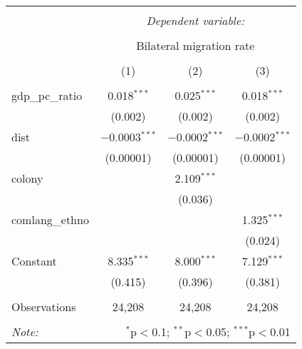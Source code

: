 
\begin{table}[!htbp] \centering 
  \caption{} 
  \label{} 
\begin{tabular}{@{\extracolsep{0pt}}lccc} 
\\[-1.8ex]\hline 
\hline \\[-1.8ex] 
 & \multicolumn{3}{c}{\textit{Dependent variable:}} \\ 
\cline{2-4} 
\\[-1.8ex] & \multicolumn{3}{c}{Bilateral migration rate} \\ 
\\[-1.8ex] & (1) & (2) & (3)\\ 
\hline \\[-1.8ex] 
 gdp\_pc\_ratio & 0.018$^{***}$ & 0.025$^{***}$ & 0.018$^{***}$ \\ 
  & (0.002) & (0.002) & (0.002) \\ 
  dist & $-$0.0003$^{***}$ & $-$0.0002$^{***}$ & $-$0.0002$^{***}$ \\ 
  & (0.00001) & (0.00001) & (0.00001) \\ 
  colony &  & 2.109$^{***}$ &  \\ 
  &  & (0.036) &  \\ 
  comlang\_ethno &  &  & 1.325$^{***}$ \\ 
  &  &  & (0.024) \\ 
  Constant & 8.335$^{***}$ & 8.000$^{***}$ & 7.129$^{***}$ \\ 
  & (0.415) & (0.396) & (0.381) \\ 
 \hline \\[-1.8ex] 
Observations & 24,208 & 24,208 & 24,208 \\ 
\hline 
\hline \\[-1.8ex] 
\textit{Note:}  & \multicolumn{3}{r}{$^{*}$p$<$0.1; $^{**}$p$<$0.05; $^{***}$p$<$0.01} \\ 
\end{tabular} 
\end{table} 
